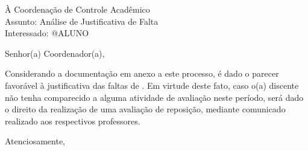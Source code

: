 


\hspace{1.4cm}




\noindent À Coordenação de Controle Acadêmico\\
Assunto: Análise de Justificativa de Falta\\
Interessado: @ALUNO

\noindent Senhor(a) Coordenador(a),

\onehalfspacing Considerando a documentação em anexo a este processo, é dado o parecer favorável à justificativa das faltas de {\bf@PERIODO}. Em virtude deste fato, caso o(a) discente não tenha comparecido a alguma atividade de avaliação neste período, será dado o direito da realização de uma avaliação de reposição, mediante comunicado realizado aos respectivos professores.

\noindent Atenciosamente,




